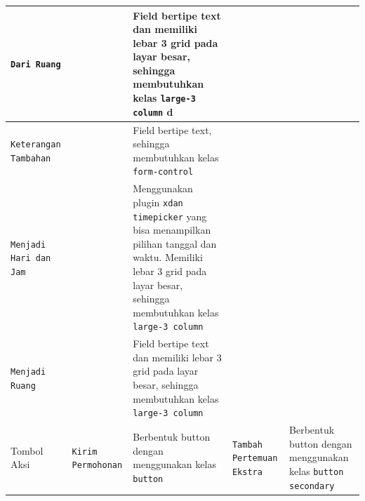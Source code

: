 \documentclass[a4paper,twoside]{article}
\begin{document}
\begin{enumerate}
\begin{tabular}{ |p{4cm}|p{2cm}|p{10cm}|}
			\hline
			\texttt{Dari Ruang} &  & Field bertipe text dan memiliki lebar 3 grid pada layar besar, sehingga membutuhkan kelas \verb|large-3 column| d \\
			\hline
			\texttt{Keterangan Tambahan} &  & Field bertipe text, sehingga membutuhkan kelas \verb|form-control| \\
			\hline
			\texttt{Menjadi Hari dan Jam} &  & Menggunakan plugin \texttt{xdan timepicker}   yang bisa menampilkan pilihan tanggal dan waktu. Memiliki lebar 3 grid pada layar besar, sehingga membutuhkan kelas \verb|large-3 column| \\
			\hline
			\texttt{Menjadi Ruang} &  & Field bertipe text dan memiliki lebar 3 grid pada layar besar, sehingga membutuhkan kelas \verb|large-3 column| \\
			\hline
			Tombol Aksi & \texttt{Kirim Permohonan} & Berbentuk button dengan menggunakan kelas \texttt{button}
			& \texttt{Tambah Pertemuan Ekstra} & Berbentuk button dengan menggunakan kelas \texttt{button secondary}
		\end{tabular}
		

\end{enumerate}
\end{document}
